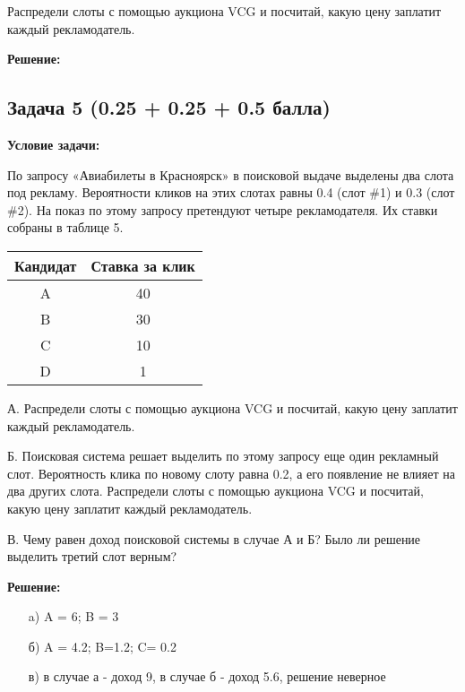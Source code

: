 \documentclass[a4paper,12pt]{article}
\begin{document}
Распредели слоты с помощью аукциона VCG и посчитай, какую цену заплатит каждый рекламодатель.

\textbf{Решение:}


\vspace{1cm}

\subsection{Задача 5 (0.25 + 0.25 + 0.5 балла)}
\textbf{Условие задачи:}

По запросу «Авиабилеты в Красноярск» в поисковой выдаче выделены два слота под рекламу. Вероятности кликов на этих слотах равны 0.4 (слот \#1) и 0.3 (слот \#2). На показ по этому запросу претендуют четыре рекламодателя. Их ставки собраны в таблице 5.

\begin{center}
\begin{tabular}{|c|c|}
\hline
Кандидат & Ставка за клик \\
\hline
A & 40 \\
B & 30 \\
C & 10 \\
D & 1 \\
\hline
\end{tabular}
\end{center}

А. Распредели слоты с помощью аукциона VCG и посчитай, какую цену заплатит каждый рекламодатель.

Б. Поисковая система решает выделить по этому запросу еще один рекламный слот. Вероятность клика по новому слоту равна 0.2, а его появление не влияет на два других слота. Распредели слоты с помощью аукциона VCG и посчитай, какую цену заплатит каждый рекламодатель.

В. Чему равен доход поисковой системы в случае А и Б? Было ли решение выделить третий слот верным?

\textbf{Решение:}

\begin{itemize}
    \item [a)] A = 6; B = 3
    \item [б)] A = 4.2; B=1.2; C= 0.2
    \item [в)] в случае а - доход 9, в случае б - доход 5.6, решение неверное
\end{itemize}
\vspace{1cm}
\end{document}
